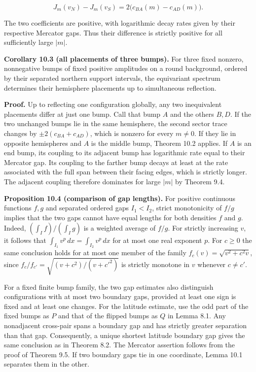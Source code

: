 \documentclass[11pt,letterpaper]{article}
\begin{document}
\[J_m(v_N)-J_m(v_S)=2\big(c_{BA}(m)-c_{AD}(m)\big).\]

The two coefficients are positive, with logarithmic decay rates given by their respective
Mercator gaps. Thus their difference is strictly positive for all sufficiently large
\(|m|\).

\textbf{Corollary 10.3 (all placements of three bumps).} For three fixed nonzero,
nonnegative bumps of fixed positive amplitudes on a round background, ordered by their
separated northern support intervals, the equivariant spectrum determines their hemisphere
placements up to simultaneous reflection.

\textbf{Proof.} Up to reflecting one configuration globally, any two inequivalent placements
differ at just one bump. Call that bump \(A\) and the others \(B,D\). If the two unchanged
bumps lie in the same hemisphere, the second sector trace changes by
\(\pm2(c_{BA}+c_{AD})\), which is nonzero for every \(m\ne0\). If they lie in opposite
hemispheres and \(A\) is the middle bump, Theorem 10.2 applies. If \(A\) is an end bump, its
coupling to its adjacent bump has logarithmic rate equal to their Mercator gap. Its coupling
to the farther bump decays at least at the rate associated with the full span between their
facing edges, which is strictly longer. The adjacent coupling therefore dominates for large
\(|m|\) by Theorem 9.4.

\textbf{Proposition 10.4 (comparison of gap lengths).} For positive continuous functions
\(f,g\) and separated ordered gaps \(I_1<I_2\), strict monotonicity of \(f/g\) implies that
the two gaps cannot have equal lengths for both densities \(f\) and \(g\). Indeed,
\((\int_I f)/(\int_I g)\) is a weighted average of \(f/g\). For strictly increasing \(v\),
it follows that \(\int_{I_1}v^p\,dx=\int_{I_2}v^p\,dx\) for at most one real exponent \(p\).
For \(c\ge0\) the same conclusion holds for at most one member of the family
\(f_c(v)=\sqrt{v^2+c^2v}\), since \(f_c/f_{c'}=\sqrt{(v+c^2)/(v+c'^2)}\) is strictly
monotone in \(v\) whenever \(c\ne c'\).

For a fixed finite bump family, the two gap estimates also distinguish configurations with
at most two boundary gaps, provided at least one sign is fixed and at least one changes. For
the latitude estimate, use the odd part of the fixed bumps as \(P\) and that of the flipped
bumps as \(Q\) in Lemma 8.1. Any nonadjacent cross-pair spans a boundary gap and has
strictly greater separation than that gap. Consequently, a unique shortest latitude boundary
gap gives the same conclusion as in Theorem 8.2. The Mercator assertion follows from the
proof of Theorem 9.5. If two boundary gaps tie in one coordinate, Lemma 10.1 separates them
in the other.
\end{document}
